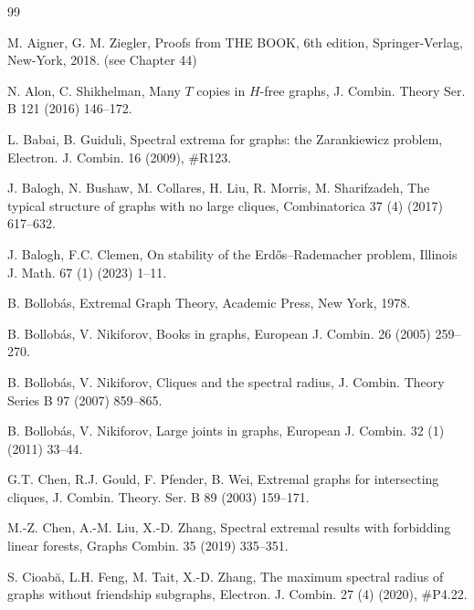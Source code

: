 \documentclass[11pt]{article}
\begin{document}
\frenchspacing
\begin{thebibliography}{99}

M. Aigner, G. M. Ziegler,
Proofs from THE BOOK, 6th edition,
Springer-Verlag, New-York, 2018. (see Chapter 44)  

N. Alon, C. Shikhelman, 
Many $T$ copies in $H$-free graphs, 
J. Combin. Theory Ser. B 121 (2016) 146--172.  

L. Babai, B. Guiduli, 
Spectral extrema for graphs: the Zarankiewicz problem, 
Electron. J. Combin. 16 (2009), \#R123. 

J. Balogh, N. Bushaw, M. Collares, H. Liu, R. Morris, M. Sharifzadeh, 
 The typical structure of graphs with no large cliques, 
 Combinatorica 37 (4) (2017)  617--632.
 
 J. Balogh, F.C. Clemen, 
 On stability of the Erd\H{o}s--Rademacher problem, 
 Illinois J. Math. 67 (1) (2023) 1--11.
 
B. Bollob\'as, 
Extremal Graph Theory, 
Academic Press, New York, 1978. 
 
B. Bollob\'{a}s, V. Nikiforov, 
Books in graphs, 
European J. Combin. 26 (2005) 259--270.  

 
B. Bollob\'{a}s, V. Nikiforov, 
Cliques and the spectral radius, 
J. Combin. Theory Series B 97 (2007) 859--865. 


B. Bollob\'{a}s, V. Nikiforov, 
Large joints in graphs,  
European J. Combin. 32 (1) (2011) 33--44.  



G.T. Chen, R.J. Gould, 
F. Pfender,  B. Wei, 
Extremal graphs for intersecting cliques, 
 J. Combin. Theory. Ser. B  89 (2003) 159--171.    


 M.-Z. Chen, A.-M. Liu, X.-D. Zhang, Spectral extremal results with forbidding linear forests,  Graphs  Combin. 35 (2019) 335--351. 
 

 S. Cioab\u{a}, L.H. Feng, M. Tait, X.-D. Zhang, 
The maximum spectral radius of graphs without friendship subgraphs, 
 Electron. J. Combin. 27 (4) (2020), \#P4.22.
 

\end{thebibliography}
\end{document}
